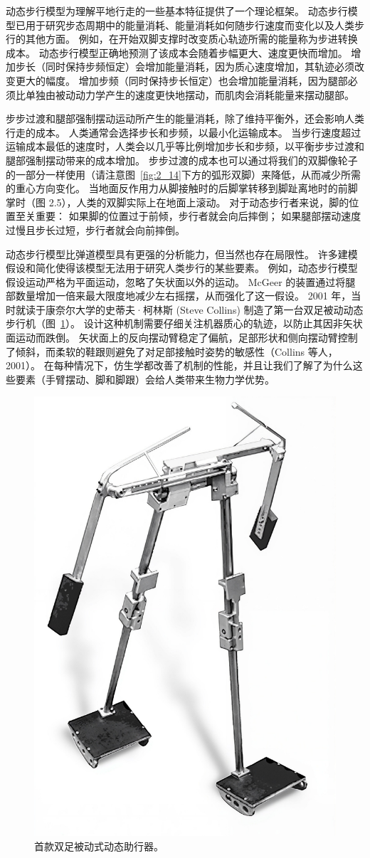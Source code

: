 动态步行模型为理解平地行走的一些基本特征提供了一个理论框架。
动态步行模型已用于研究步态周期中的能量消耗、能量消耗如何随步行速度而变化以及人类步行的其他方面。
例如，在开始双脚支撑时改变质心轨迹所需的能量称为步进转换成本。
动态步行模型正确地预测了该成本会随着步幅更大、速度更快而增加。
增加步长（同时保持步频恒定）会增加能量消耗，因为质心速度增加，其轨迹必须改变更大的幅度。
增加步频（同时保持步长恒定）也会增加能量消耗，因为腿部必须比单独由被动动力学产生的速度更快地摆动，而肌肉会消耗能量来摆动腿部。


步步过渡和腿部强制摆动运动所产生的能量消耗，除了维持平衡外，还会影响人类行走的成本。
人类通常会选择步长和步频，以最小化运输成本。
当步行速度超过运输成本最低的速度时，人类会以几乎等比例增加步长和步频，以平衡步步过渡和腿部强制摆动带来的成本增加。
步步过渡的成本也可以通过将我们的双脚像轮子的一部分一样使用（请注意图~\ref{fig:2_14}下方的弧形双脚）来降低，从而减少所需的重心方向变化。
当地面反作用力从脚接触时的后脚掌转移到脚趾离地时的前脚掌时（图 2.5），人类的双脚实际上在地面上滚动。
对于动态步行者来说，脚的位置至关重要：
如果脚的位置过于前倾，步行者就会向后摔倒；
如果腿部摆动速度过慢且步长过短，步行者就会向前摔倒。


动态步行模型比弹道模型具有更强的分析能力，但当然也存在局限性。
许多建模假设和简化使得该模型无法用于研究人类步行的某些要素。
例如，动态步行模型假设运动严格为平面运动，忽略了矢状面以外的运动。
McGeer 的装置通过将腿部数量增加一倍来最大限度地减少左右摇摆，从而强化了这一假设。
2001 年，当时就读于康奈尔大学的史蒂夫·柯林斯 (Steve Collins) 制造了第一台双足被动动态步行机（图~\ref{fig:2_15}）。
设计这种机制需要仔细关注机器质心的轨迹，以防止其因非矢状面运动而跌倒。
矢状面上的反向摆动臂稳定了偏航，足部形状和侧向摆动臂控制了倾斜，而柔软的鞋跟则避免了对足部接触时姿势的敏感性（Collins 等人，2001）。
在每种情况下，仿生学都改善了机制的性能，并且让我们了解了为什么这些要素（手臂摆动、脚和脚跟）会给人类带来生物力学优势。


\begin{figure}[!htb]
	\centering
	\includegraphics[width=0.45\linewidth]{chap2/2_15}
	\caption{首款双足被动式动态助行器。 \label{fig:2_15}}
\end{figure}


